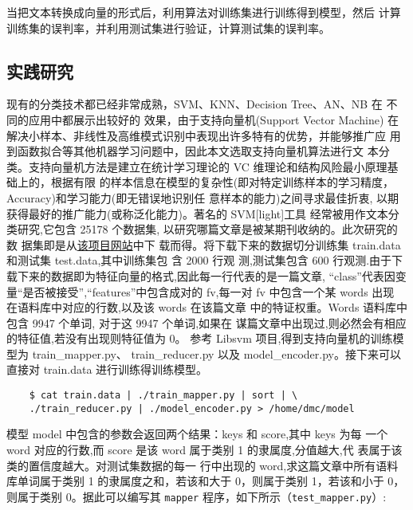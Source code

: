 当把文本转换成向量的形式后，利用算法对训练集进行训练得到模型，然后
计算训练集的误判率，并利用测试集进行验证，计算测试集的误判率。

\subsection{实践研究}\label{ux5b9eux8df5ux7814ux7a76}

现有的分类技术都已经非常成熟，SVM、KNN、Decision Tree、AN、NB 在
不同的应用中都展示出较好的 效果，由于支持向量机(Support Vector Machine)
在解决小样本、非线性及高维模式识别中表现出许多特有的优势，并能够推广应
用到函数拟合等其他机器学习问题中，因此本文选取支持向量机算法进行文
本分类。支持向量机方法是建立在统计学习理论的 VC
维理论和结构风险最小原理基 础上的，根据有限
的样本信息在模型的复杂性(即对特定训练样本的学习精度，
Accuracy)和学习能力(即无错误地识别任 意样本的能力)之间寻求最佳折衷,
以期获得最好的推广能力(或称泛化能力)。著名的 SVM{[}light{]}工具
经常被用作文本分类研究,它包含 25178 个数据集,
以研究哪篇文章是被某期刊收纳的。此次研究的数
据集即是从\href{http://download.joachims.org/svm_light/examples/example1.tar.gz}{该项目网站}中下
载而得。将下载下来的数据切分训练集 train.data 和测试集
test.data,其中训练集包 含 2000 行观 测,测试集包含 600
行观测.由于下载下来的数据即为特征向量的格式,因此每一行代表的是一篇文章,
``class''代表因变量``是否被接受'',``features''中包含成对的 fv,每一对 fv
中包含一个某 words 出现 在语料库中对应的行数,以及该 words 在该篇文章
中的特证权重。Words 语料库中包含 9947 个单词, 对于这 9947 个单词,如果在
谋篇文章中出现过,则必然会有相应的特征值,若没有出现则特征值为 0。 参考
Libsvm 项目,得到支持向量机的训练模型为 train\_mapper.py、
train\_reducer.py 以及 model\_encoder.py。接下来可以直接对 train.data
进行训练得训练模型。

\begin{lstlisting}
	$ cat train.data | ./train_mapper.py | sort | \
	./train_reducer.py | ./model_encoder.py > /home/dmc/model
\end{lstlisting}

模型 model 中包含的参数会返回两个结果：keys 和 score,其中 keys 为每 一个
word 对应的行数,而 score 是该 word 属于类别 1 的隶属度,分值越大,代
表属于该类的置信度越大。对测试集数据的每一 行中出现的
word,求这篇文章中所有语料库单词属于类别 1 的隶属度之和，若该和大于
0，则属于类别 1，若该和小于 0，则属于类别 0。据此可以编写其 \lstinline|mapper|
程序，如下所示（\texttt{test\_mapper.py}）:

